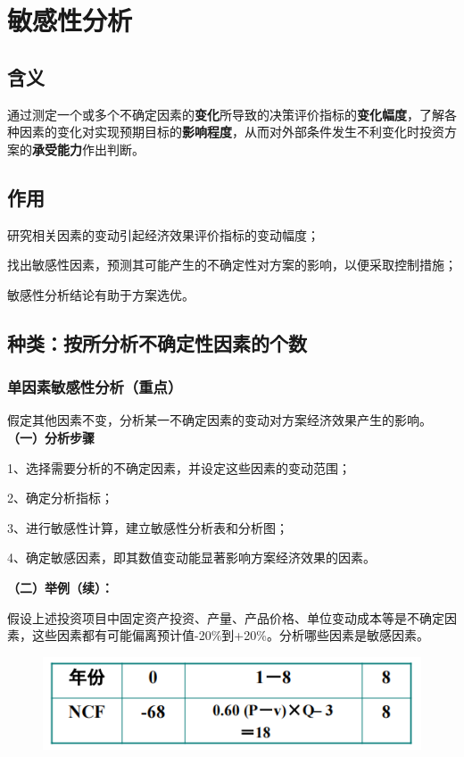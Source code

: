 \section{敏感性分析}
\subsection{含义}
通过测定一个或多个不确定因素的\textbf{变化}所导致的决策评价指标的\textbf{变化幅度}，了解各种因素的变化对实现预期目标的\textbf{影响程度}，从而对外部条件发生不利变化时投资方案的\textbf{承受能力}作出判断。

\subsection{作用}
研究相关因素的变动引起经济效果评价指标的变动幅度；

找出敏感性因素，预测其可能产生的不确定性对方案的影响，以便采取控制措施；

敏感性分析结论有助于方案选优。

\subsection{种类：按所分析不确定性因素的个数}

\subsubsection{单因素敏感性分析（重点）}
假定其他因素不变，分析某一不确定因素的变动对方案经济效果产生的影响。\\
\textbf{（一）分析步骤}

1、选择需要分析的不确定因素，并设定这些因素的变动范围；

2、确定分析指标；

3、进行敏感性计算，建立敏感性分析表和分析图；

4、确定敏感因素，即其数值变动能显著影响方案经济效果的因素。

\noindent \textbf{（二）举例（续）：}

假设上述投资项目中固定资产投资、产量、产品价格、单位变动成本等是不确定因素，这些因素都有可能偏离预计值-20\%到+20\%。分析哪些因素是敏感因素。

\begin{figure}[H]
    \centering
    \includegraphics[width=0.85\linewidth]{image/单因素-例题.png}
\end{figure}


